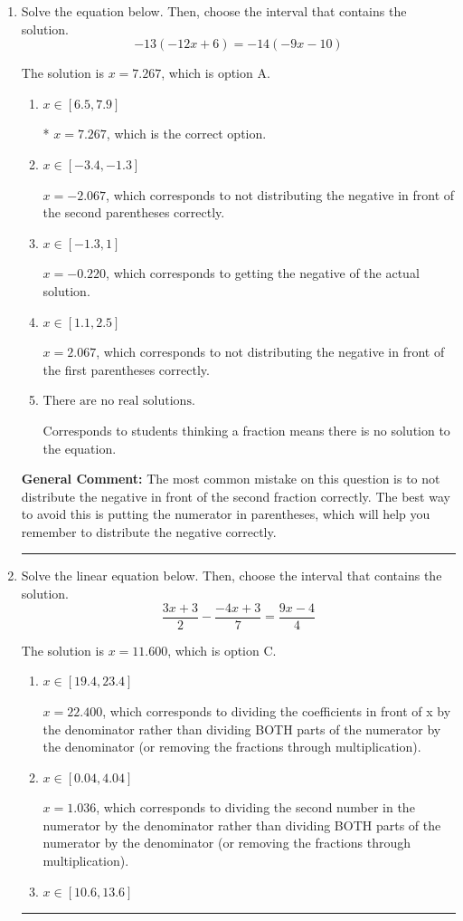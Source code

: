 \documentclass{extbook}[14pt]
\newcommand{\litem}[1]{\item #1

\rule{\textwidth}{0.4pt}}
\begin{document}
\begin{enumerate}\litem{
Solve the equation below. Then, choose the interval that contains the solution.
\[ -13(-12x + 6) = -14(-9x -10) \]

The solution is \( x = 7.267 \), which is option A.\begin{enumerate}[label=\Alph*.]
\item \( x \in [6.5, 7.9] \)

* $x = 7.267$, which is the correct option.
\item \( x \in [-3.4, -1.3] \)

$x = -2.067$, which corresponds to not distributing the negative in front of the second parentheses correctly.
\item \( x \in [-1.3, 1] \)

$x = -0.220$, which corresponds to getting the negative of the actual solution.
\item \( x \in [1.1, 2.5] \)

$x = 2.067$, which corresponds to not distributing the negative in front of the first parentheses correctly.
\item \( \text{There are no real solutions.} \)

Corresponds to students thinking a fraction means there is no solution to the equation.
\end{enumerate}

\textbf{General Comment:} The most common mistake on this question is to not distribute the negative in front of the second fraction correctly. The best way to avoid this is putting the numerator in parentheses, which will help you remember to distribute the negative correctly.
}
\litem{
Solve the linear equation below. Then, choose the interval that contains the solution.
\[ \frac{3x + 3}{2} - \frac{-4x + 3}{7} = \frac{9x -4}{4} \]

The solution is \( x = 11.600 \), which is option C.\begin{enumerate}[label=\Alph*.]
\item \( x \in [19.4, 23.4] \)

 $x = 22.400$, which corresponds to dividing the coefficients in front of x by the denominator rather than dividing BOTH parts of the numerator by the denominator (or removing the fractions through multiplication).
\item \( x \in [0.04, 4.04] \)

 $x = 1.036$, which corresponds to dividing the second number in the numerator by the denominator rather than dividing BOTH parts of the numerator by the denominator (or removing the fractions through multiplication).
\item \( x \in [10.6, 13.6] \)


\end{enumerate}}
\end{enumerate}
\end{document}

